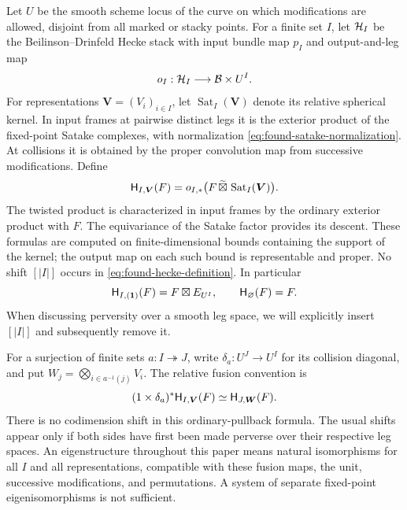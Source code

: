Let $U$ be the smooth scheme locus of the curve on which modifications are
allowed, disjoint from all marked or stacky points.  For a finite set $I$,
let $\mathcal H_I$ be the Beilinson--Drinfeld Hecke stack with input bundle map
$p_I$ and output-and-leg map
\[
                       o_I:\mathcal H_I\longrightarrow\mathcal B\times U^I.
\]
For representations $\boldsymbol V=(V_i)_{i\in I}$, let
$\operatorname{Sat}_I(\boldsymbol V)$ denote its relative spherical
kernel.  In input frames at pairwise distinct legs it is the exterior
product of the fixed-point Satake complexes, with normalization
\eqref{eq:found-satake-normalization}.  At collisions it is obtained by
the proper convolution map from successive modifications.  Define
\begin{equation}\label{eq:found-hecke-definition}
 \mathsf H_{I,\boldsymbol V}(F)
   =o_{I,*}\bigl(F\,\widetilde\boxtimes\,
                                  \operatorname{Sat}_I(\boldsymbol V)\bigr).
\end{equation}
The twisted product is characterized in input frames by the ordinary
exterior product with $F$.  The equivariance of the Satake factor provides
its descent.  These formulas are computed on finite-dimensional bounds
containing the support of the kernel; the output map on each such bound
is representable and proper.  No shift $[|I|]$ occurs in
\eqref{eq:found-hecke-definition}.  In particular
\begin{equation}\label{eq:found-hecke-unit}
 \mathsf H_{I,(\mathbf1)}(F)=F\boxtimes E_{U^I},\qquad \mathsf H_{\varnothing}(F)=F.
\end{equation}
When discussing perversity over a smooth leg space, we will explicitly
insert $[|I|]$ and subsequently remove it.

For a surjection of finite sets $a:I\twoheadrightarrow J$, write
$\delta_a:U^J\to U^I$ for its collision diagonal, and put
$W_j=\bigotimes_{i\in a^{-1}(j)}V_i$.  The relative fusion convention is
\begin{equation}\label{eq:found-fusion}
  (1\times\delta_a)^*\mathsf H_{I,\boldsymbol V}(F)
                         \simeq \mathsf H_{J,\boldsymbol W}(F).
\end{equation}
There is no codimension shift in this ordinary-pullback formula.  The
usual shifts appear only if both sides have first been made perverse over
their respective leg spaces.  An eigenstructure throughout this paper
means natural isomorphisms for all $I$ and all representations, compatible
with these fusion maps, the unit, successive modifications, and
permutations.  A system of separate fixed-point eigenisomorphisms is not
sufficient.

